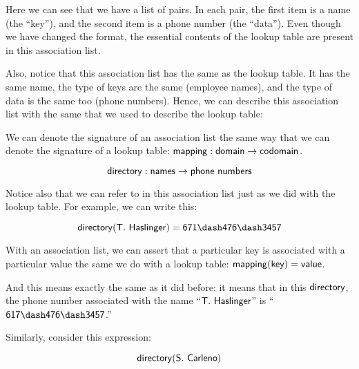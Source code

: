 \documentclass[../../../main.tex]{subfiles}
\begin{document}
Here we can see that we have a list of pairs. In each pair, the first item is a name (the ``key''), and the second item is a phone number (the ``data''). Even though we have changed the format, the essential contents of the lookup table are present in this association list.

Also, notice that this association list has the same  as the lookup table. It has the same name, the type of keys are the same (employee names), and the type of data is the same too (phone numbers). Hence, we can describe this association list with the same  that we used to describe the lookup table:

\begin{aside}
  \begin{remark}
    We can denote the signature of an association list the same way that we can denote the signature of a lookup table: $\mathsf{mapping : domain \rightarrow codomain}$.
  \end{remark}
\end{aside}

\begin{equation*}
  \mathsf{directory} : \mathsf{names} \rightarrow \mathsf{phone~numbers}
\end{equation*}

Notice also that we can refer to  in this association list just as we did with the lookup table. For example, we can write this:

\begin{equation*}
  \e{directory(T.~Haslinger) = 671\dash476\dash3457}
\end{equation*}

\begin{aside}
  \begin{remark}
    With an association list, we can assert that a particular key is associated with a particular value the same we do with a lookup table: $\mathsf{mapping(key) = value}$.
  \end{remark}
\end{aside}

And this means exactly the same as it did before: it means that in this $\mathsf{directory}$, the phone number associated with the name ``$\mathsf{T.~Haslinger}$'' is ``$\e{617\dash476\dash3457}$.'' 

Similarly, consider this expression:

\begin{equation*}
  \mathsf{directory(S.~Carleno)}
\end{equation*}
\end{document}
